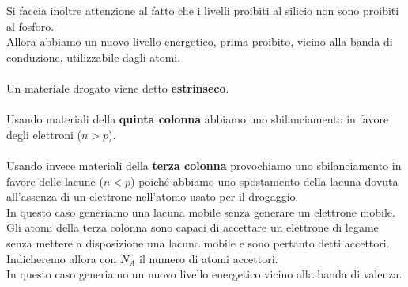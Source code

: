 \documentclass{article}
\numberwithin{equation}{subsection}
\begin{document}
	Si faccia inoltre attenzione al fatto che i livelli proibiti al silicio non sono proibiti al fosforo. \\
	Allora abbiamo un nuovo livello energetico, prima proibito, vicino alla banda di conduzione, utilizzabile dagli atomi.\\\\
	Un materiale drogato viene detto \textbf{estrinseco}.\\\\
	Usando materiali della \textbf{quinta colonna} abbiamo uno sbilanciamento in favore degli elettroni ($n > p$).\\\\
	Usando invece materiali della \textbf{terza colonna} provochiamo uno sbilanciamento in favore delle lacune ($n < p$) poiché abbiamo uno spostamento della lacuna dovuta all’assenza di un elettrone nell’atomo usato per il drogaggio. \\
	In questo caso generiamo una lacuna mobile senza generare un elettrone mobile. \\
	Gli atomi della terza colonna sono capaci di accettare un elettrone di legame senza mettere a disposizione una lacuna mobile e sono pertanto detti accettori. \\
	Indicheremo allora con $N_A$ il numero di atomi accettori. \\
	In questo caso generiamo un nuovo livello energetico vicino alla banda di valenza.
\end{document}
